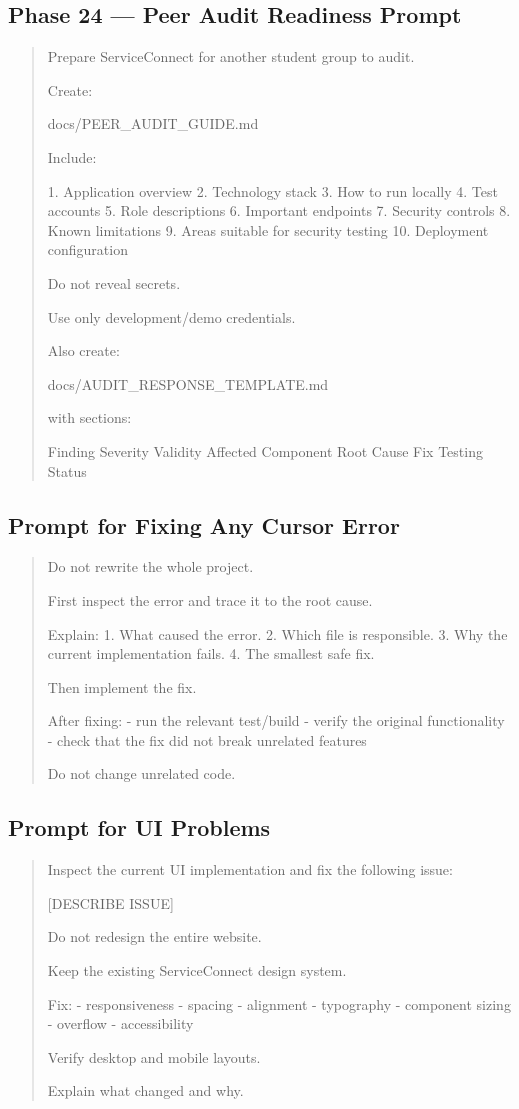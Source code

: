 \subsection*{Phase 24 --- Peer Audit Readiness Prompt}

\begin{quote}
Prepare ServiceConnect for another student group to audit.

Create:

docs/PEER_AUDIT_GUIDE.md

Include:

1. Application overview
2. Technology stack
3. How to run locally
4. Test accounts
5. Role descriptions
6. Important endpoints
7. Security controls
8. Known limitations
9. Areas suitable for security testing
10. Deployment configuration

Do not reveal secrets.

Use only development/demo credentials.

Also create:

docs/AUDIT_RESPONSE_TEMPLATE.md

with sections:

Finding
Severity
Validity
Affected Component
Root Cause
Fix
Testing
Status
\end{quote}

\subsection*{Prompt for Fixing Any Cursor Error}

\begin{quote}
Do not rewrite the whole project.

First inspect the error and trace it to the root cause.

Explain:
1. What caused the error.
2. Which file is responsible.
3. Why the current implementation fails.
4. The smallest safe fix.

Then implement the fix.

After fixing:
- run the relevant test/build
- verify the original functionality
- check that the fix did not break unrelated features

Do not change unrelated code.
\end{quote}

\subsection*{Prompt for UI Problems}

\begin{quote}
Inspect the current UI implementation and fix the following issue:

[DESCRIBE ISSUE]

Do not redesign the entire website.

Keep the existing ServiceConnect design system.

Fix:
- responsiveness
- spacing
- alignment
- typography
- component sizing
- overflow
- accessibility

Verify desktop and mobile layouts.

Explain what changed and why.
\end{quote}


